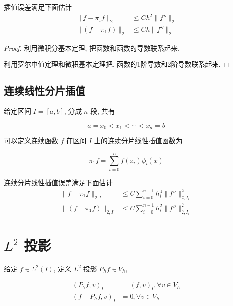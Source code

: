 \documentclass{article}
\begin{document}
\begin{framed}
    \begin{proposition}
        插值误差满足下面估计
        \begin{align*}
            \|f- \pi_1 f\|_2 &\leq C h^2 \|f''\|_2 \\
            \|(f - \pi_1 f)\|_2 &\leq C h \|f''\|_2
        \end{align*}
    \end{proposition}
    \begin{proof}
        利用微积分基本定理, 把函数和函数的导数联系起来. 

        利用罗尔中值定理和微积基本定理把, 函数的1阶导数和2阶导数联系起来.
    \end{proof}
\end{framed}

\subsection{连续线性分片插值}

给定区间 $I=[a, b]$, 分成 $n$ 段, 共有 

$$
a = x_0 < x_1 < \cdots < x_n=b
$$

可以定义连续函数 $f$ 在区间 $I$ 上的连续分片线性插值函数为

$$
\pi_1 f = \sum_{i=0}^n f(x_i) \phi_i(x)
$$

\begin{framed}
    \begin{proposition}
        连续分片线性插值误差满足下面估计
        \begin{align*}
            \|f- \pi_1 f\|_{2,I} &\leq C \sum_{i=0}^{n-1} h_i^4 \|f''\|_{2,
            I_i}^2 \\
            \|(f - \pi_1 f)\|_{2, I} &\leq C \sum_{i=0}^{n-1}h_i^2 \|f''\|_{2,
            I_i}^2
        \end{align*}
    \end{proposition}
\end{framed}

\section{$L^2$ 投影}

给定 $f\in L^2(I)$, 定义 $L^2$ 投影 $P_h f \in V_h$, 

\begin{align*}
    (P_h f, v)_I &= (f, v)_I, \forall v\in V_h\\
    (f - P_h f, v)_I &= 0, \forall v\in V_h
\end{align*}
\end{document}
